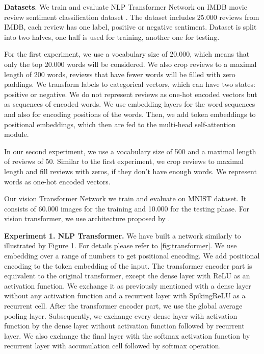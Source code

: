 \documentclass{article}
\begin{document}
\textbf{Datasets}. We train and evaluate NLP Transformer Network on IMDB movie review sentiment classification dataset \cite{imdb_dataset}. The dataset includes 25.000 reviews from IMDB, each review has one label, positive or negative sentiment. Dataset is split into two halves, one half is used for training, another one for testing.

For the first experiment, we use a vocabulary size of 20.000, which means that only the top 20.000 words will be considered. We also crop reviews to a maximal length of 200 words, reviews that have fewer words will be filled with zero paddings. We transform labels to categorical vectors, which can have two states: positive or negative. We do not represent reviews as one-hot encoded vectors but as sequences of encoded words. We use embedding layers for the word sequences and also for encoding positions of the words. Then, we add token embeddings to positional embeddings, which then are fed to the multi-head self-attention module.

In our second experiment, we use a vocabulary size of 500 and a maximal length of reviews of 50. Similar to the first experiment, we crop reviews to maximal length and fill reviews with zeros, if they don't have enough words. We represent words as one-hot encoded vectors.

Our vision Transformer Network we train and evaluate on MNIST dataset. It consists of 60.000 images for the training and 10.000 for the testing phase. For vision transformer, we use architecture proposed by \cite{16x16words}.

\textbf{Experiment 1. NLP Transformer.} We have built a network similarly to \cite{transformer} illustrated by Figure 1. For details please refer to \ref{fig:transformer}. We use embedding over a range of numbers to get positional encoding. We add positional encoding to the token embedding of the input. The transformer encoder part is equivalent to the original transformer, except the dense layer with ReLU as an activation function. We exchange it as previously mentioned with a dense layer without any activation function and a recurrent layer with SpikingReLU as a recurrent cell. After the transformer encoder part, we use the global average pooling layer. Subsequently, we exchange every dense layer with activation function by the dense layer without activation function followed by recurrent layer. We also exchange the final layer with the softmax activation function by recurrent layer with accumulation cell followed by softmax operation.
\end{document}
